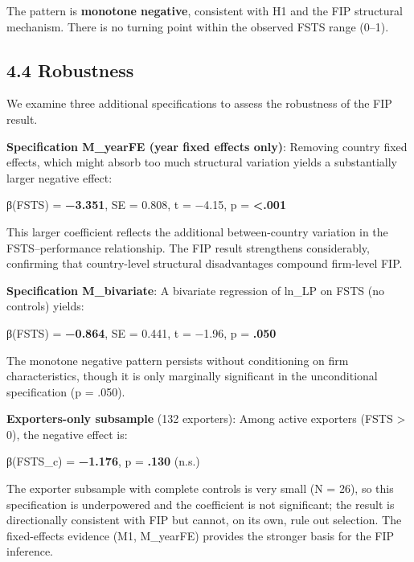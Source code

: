 \documentclass[
  12pt]{article}
\begin{document}
The pattern is \textbf{monotone negative}, consistent with H1 and the
FIP structural mechanism. There is no turning point within the observed
FSTS range (0--1).

\hypertarget{robustness}{%
\subsection{4.4 Robustness}\label{robustness}}

We examine three additional specifications to assess the robustness of
the FIP result.

\textbf{Specification M\_yearFE (year fixed effects only)}: Removing
country fixed effects, which might absorb too much structural variation
yields a substantially larger negative effect:

β(FSTS) = \textbf{−3.351}, SE = 0.808, t = −4.15, p =
\textbf{\textless.001}

This larger coefficient reflects the additional between-country
variation in the FSTS--performance relationship. The FIP result
strengthens considerably, confirming that country-level structural
disadvantages compound firm-level FIP.

\textbf{Specification M\_bivariate}: A bivariate regression of ln\_LP on
FSTS (no controls) yields:

β(FSTS) = \textbf{−0.864}, SE = 0.441, t = −1.96, p = \textbf{.050}

The monotone negative pattern persists without conditioning on firm
characteristics, though it is only marginally significant in the
unconditional specification (p = .050).

\textbf{Exporters-only subsample} (132 exporters): Among active
exporters (FSTS \textgreater{} 0), the negative effect is:

β(FSTS\_c) = \textbf{−1.176}, p = \textbf{.130} (n.s.)

The exporter subsample with complete controls is very small (N = 26), so
this specification is underpowered and the coefficient is not
significant; the result is directionally consistent with FIP but cannot,
on its own, rule out selection. The fixed-effects evidence (M1,
M\_yearFE) provides the stronger basis for the FIP inference.
\end{document}
